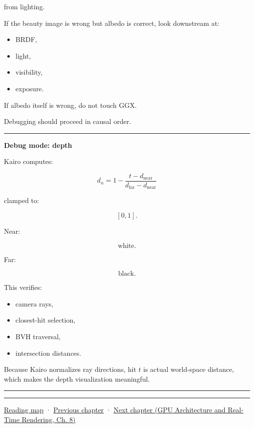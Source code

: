 from lighting.

If the beauty image is wrong but albedo is correct, look downstream at:

\begin{itemize}
\tightlist
\item
  BRDF,
\item
  light,
\item
  visibility,
\item
  exposure.
\end{itemize}

If albedo itself is wrong, do not touch GGX.

Debugging should proceed in causal order.

\begin{center}\rule{0.5\linewidth}{0.5pt}\end{center}

\textbf{Debug mode: depth}

Kairo computes:

\[
d_n
=
1-
\frac{
t-d_{\text{near}}
}{
d_{\text{far}}-d_{\text{near}}
}
\]

clamped to:

\[
[0,1].
\]

Near:

\[
\text{white}.
\]

Far:

\[
\text{black}.
\]

This verifies:

\begin{itemize}
\tightlist
\item
  camera rays,
\item
  closest-hit selection,
\item
  BVH traversal,
\item
  intersection distances.
\end{itemize}

Because Kairo normalizes ray directions, hit \(t\) is actual world-space distance, which makes the depth visualization meaningful.

\begin{center}\rule{0.5\linewidth}{0.5pt}\end{center}

\begin{center}\rule{0.5\linewidth}{0.5pt}\end{center}

\hyperref[volume-reading-map]{Reading map} · \hyperref[03-visual-computing-i-ch009-point-lights-mis-and-environment-lighting]{Previous chapter} · \href{../06-GPU-Architecture-and-Real-Time-Rendering/main.pdf\#nameddest=03-visual-computing-i-ch011-bvh-traversal-and-deterministic-evidence}{Next chapter (GPU Architecture and Real-Time Rendering, Ch. 8)}
